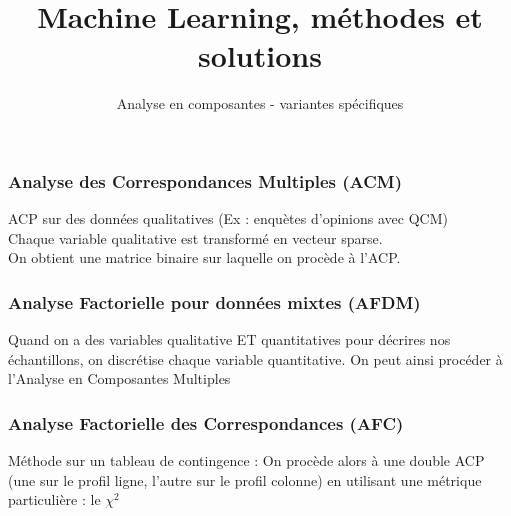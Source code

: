 \documentclass{formation}
\title{Machine Learning, méthodes et solutions}
\subtitle{Analyse en composantes - variantes spécifiques}
\begin{document}
\maketitle

\begin{frame}
  \frametitle{Analyse des Correspondances Multiples (ACM)}
  ACP sur des données qualitatives (Ex : enquètes d'opinions avec QCM) \\
  Chaque variable qualitative est transformé en vecteur sparse. \\
  On obtient une matrice binaire sur laquelle on procède à l'ACP.\\
\end{frame}

\begin{frame}
  \frametitle{Analyse Factorielle pour données mixtes (AFDM)}
  Quand on a des variables qualitative ET quantitatives pour décrires nos échantillons, on discrétise chaque variable quantitative. On peut ainsi procéder à l'Analyse en Composantes Multiples
\end{frame}

\begin{frame}
  \frametitle{Analyse Factorielle des Correspondances (AFC)}
  Méthode sur un tableau de contingence :
  On procède alors à une double ACP (une sur le profil ligne, l'autre sur le profil colonne) en utilisant une métrique particulière : le $\chi^2$
\end{frame}
\end{document}
